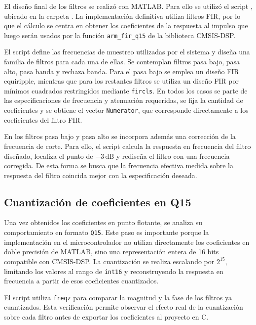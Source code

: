 \documentclass[12pt]{article}
\begin{document}
	El diseño final de los filtros se realizó con MATLAB. Para ello se utilizó el script
	, ubicado en la carpeta .
	La implementación definitiva utiliza filtros FIR, por lo que el cálculo se centra
	en obtener los coeficientes de la respuesta al impulso que luego serán usados
	por la función \texttt{arm\_fir\_q15} de la biblioteca CMSIS-DSP.
	
	El script define las frecuencias de muestreo utilizadas por el sistema y diseña una familia de filtros para cada una de ellas. Se contemplan filtros pasa bajo, pasa alto, pasa banda y rechaza banda. Para el pasa bajo se emplea un diseño FIR equiripple, mientras que para los restantes filtros se utiliza un diseño FIR por mínimos cuadrados restringidos mediante \texttt{fircls}. En todos los casos se parte de las especificaciones de frecuencia y atenuación requeridas, se fija la cantidad de coeficientes y se obtiene el vector \texttt{Numerator}, que corresponde directamente a los coeficientes del filtro FIR.
	
	En los filtros pasa bajo y pasa alto se incorpora además una corrección de la frecuencia de corte. Para ello, el script calcula la respuesta en frecuencia del filtro diseñado, localiza el punto de \(-3\,\mathrm{dB}\) y rediseña el filtro con una frecuencia corregida. De esta forma se busca que la frecuencia efectiva medida sobre la respuesta del filtro coincida mejor con la especificación deseada.
	
	\subsection{Cuantización de coeficientes en Q15}
	
	Una vez obtenidos los coeficientes en punto flotante, se analiza su comportamiento en formato \texttt{Q15}. Este paso es importante porque la implementación en el microcontrolador no utiliza directamente los coeficientes en doble precisión de MATLAB, sino una representación entera de 16 bits compatible con CMSIS-DSP. La cuantización se realiza escalando por \(2^{15}\), limitando los valores al rango de \texttt{int16} y reconstruyendo la respuesta en frecuencia a partir de esos coeficientes cuantizados.
	
	El script utiliza \texttt{freqz} para comparar la magnitud y la fase de los filtros ya cuantizados. Esta verificación permite observar el efecto real de la cuantización sobre cada filtro antes de exportar los coeficientes al proyecto en C.
	
\end{document}
